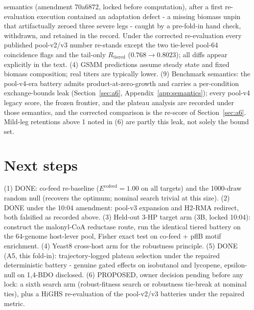 \documentclass[12pt,a4paper]{article}
\begin{document}
semantics (amendment 70a6872, locked before computation), after a first re-evaluation execution contained an adaptation defect - a missing biomass unpin that artifactually zeroed three severe legs - caught by a pre-fold-in hand check, withdrawn, and retained in the record. Under the corrected re-evaluation every published pool-v2/v3 number re-stands except the two tie-level pool-64 coincidence flags and the tail-only $R_{\mathrm{tiered}}$ ($0.768 \to 0.8023$); all diffs appear explicitly in the text. (4) GSMM predictions assume steady state and fixed biomass composition; real titers are typically lower. (9) Benchmark semantics: the pool-v4-era battery admits product-at-zero-growth and carries a per-condition exchange-bounds leak (Section~\ref{sec:a6}, Appendix~\ref{app:semantics}); every pool-v4 legacy score, the frozen frontier, and the plateau analysis are recorded under those semantics, and the corrected comparison is the re-score of Section~\ref{sec:a6}. Mild-leg retentions above 1 noted in (6) are partly this leak, not solely the bound set.

\section{Next steps}
(1) DONE: co-feed re-baseline ($E^{\mathrm{cofeed}} = 1.00$ on all targets) and the 1000-draw random null (recovers the optimum; nominal search trivial at this size). (2) DONE under the 10:04 amendment: pool-v3 expansion and H2-RMA redirect, both falsified as recorded above. (3) Held-out 3-HP target arm (3B, locked 10:04): construct the malonyl-CoA reductase route, run the identical tiered battery on the 64-genome host-lever pool, Fisher exact test on co-feed + pflB motif enrichment. (4) Yeast8 cross-host arm for the robustness principle. (5) DONE (A5, this fold-in): trajectory-logged plateau selection under the repaired deterministic battery - genuine gated effects on isobutanol and lycopene, epsilon-null on 1,4-BDO disclosed. (6) PROPOSED, owner decision pending before any lock: a sixth search arm (robust-fitness search or robustness tie-break at nominal ties), plus a HiGHS re-evaluation of the pool-v2/v3 batteries under the repaired metric.
\end{document}
